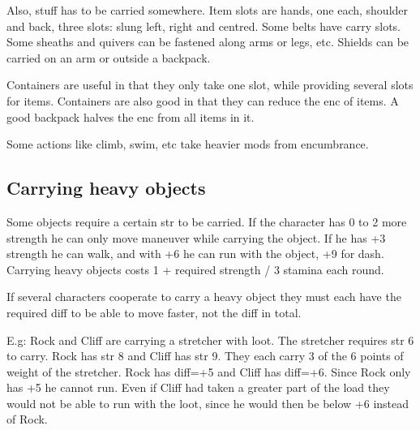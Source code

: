 Also, stuff has to be carried somewhere. Item slots are hands, one each, shoulder and back, three slots: slung left, right and centred. Some belts have carry slots. Some sheaths and quivers can be fastened along arms or legs, etc. Shields can be carried on an arm or outside a backpack.

Containers are useful in that they only take one slot, while providing several slots for items. Containers are also good in that they can reduce the enc of items. A good backpack halves the enc from all items in it.

Some actions like climb, swim, etc take heavier mods from encumbrance.


\subsection*{Carrying heavy objects}
Some objects require a certain str to be carried. If the character has 0 to 2 more strength he can only move maneuver while carrying the object. If he has +3 strength he can walk, and with +6 he can run with the object, +9 for dash.
Carrying heavy objects costs 1 + required strength / 3 stamina each round.

If several characters cooperate to carry a heavy object they must each have the required diff to be able to move faster, not the diff in total.

E.g: Rock and Cliff are carrying a stretcher with loot. The stretcher requires str 6 to carry. Rock has str 8 and Cliff has str 9. They each carry 3 of the 6 points of weight of the stretcher. Rock has diff=+5 and Cliff has diff=+6. Since Rock only has +5 he cannot run. Even if Cliff had taken a greater part of the load they would not be able to run with the loot, since he would then be below +6 instead of Rock.
















